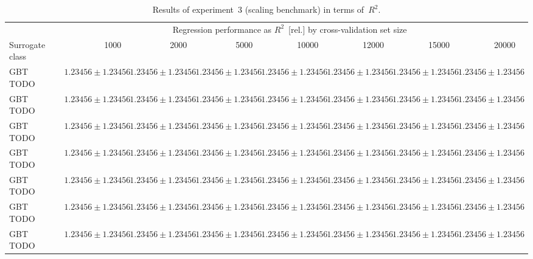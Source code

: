 \begin{table}[h]
	\centering
	{\footnotesize
		\begin{tabular}{lrrrrrrrr}
		\toprule
		{} & \multicolumn{7}{c}{Regression performance as $R^2$~[rel.] by cross-validation set size}\\
		\cmidrule(lr){2-8}
		Surrogate class
						& \num{1000}
						& \num{2000}
						& \num{5000}
						& \num{10000}
						& \num{12000}
						& \num{15000}
						& \num{20000}\\
		\midrule
		GBT TODO
						& $\num{1.23456} \pm \num{1.23456}$
						& $\num{1.23456} \pm \num{1.23456}$
						& $\num{1.23456} \pm \num{1.23456}$
						& $\num{1.23456} \pm \num{1.23456}$
						& $\num{1.23456} \pm \num{1.23456}$
						& $\num{1.23456} \pm \num{1.23456}$
						& $\num{1.23456} \pm \num{1.23456}$
		\\
		GBT TODO
						& $\num{1.23456} \pm \num{1.23456}$
						& $\num{1.23456} \pm \num{1.23456}$
						& $\num{1.23456} \pm \num{1.23456}$
						& $\num{1.23456} \pm \num{1.23456}$
						& $\num{1.23456} \pm \num{1.23456}$
						& $\num{1.23456} \pm \num{1.23456}$
						& $\num{1.23456} \pm \num{1.23456}$
		\\
		GBT TODO
						& $\num{1.23456} \pm \num{1.23456}$
						& $\num{1.23456} \pm \num{1.23456}$
						& $\num{1.23456} \pm \num{1.23456}$
						& $\num{1.23456} \pm \num{1.23456}$
						& $\num{1.23456} \pm \num{1.23456}$
						& $\num{1.23456} \pm \num{1.23456}$
						& $\num{1.23456} \pm \num{1.23456}$
		\\
		GBT TODO
						& $\num{1.23456} \pm \num{1.23456}$
						& $\num{1.23456} \pm \num{1.23456}$
						& $\num{1.23456} \pm \num{1.23456}$
						& $\num{1.23456} \pm \num{1.23456}$
						& $\num{1.23456} \pm \num{1.23456}$
						& $\num{1.23456} \pm \num{1.23456}$
						& $\num{1.23456} \pm \num{1.23456}$
		\\
		GBT TODO
						& $\num{1.23456} \pm \num{1.23456}$
						& $\num{1.23456} \pm \num{1.23456}$
						& $\num{1.23456} \pm \num{1.23456}$
						& $\num{1.23456} \pm \num{1.23456}$
						& $\num{1.23456} \pm \num{1.23456}$
						& $\num{1.23456} \pm \num{1.23456}$
						& $\num{1.23456} \pm \num{1.23456}$
		\\
		GBT TODO
						& $\num{1.23456} \pm \num{1.23456}$
						& $\num{1.23456} \pm \num{1.23456}$
						& $\num{1.23456} \pm \num{1.23456}$
						& $\num{1.23456} \pm \num{1.23456}$
						& $\num{1.23456} \pm \num{1.23456}$
						& $\num{1.23456} \pm \num{1.23456}$
						& $\num{1.23456} \pm \num{1.23456}$
		\\
		GBT TODO
						& $\num{1.23456} \pm \num{1.23456}$
						& $\num{1.23456} \pm \num{1.23456}$
						& $\num{1.23456} \pm \num{1.23456}$
						& $\num{1.23456} \pm \num{1.23456}$
						& $\num{1.23456} \pm \num{1.23456}$
						& $\num{1.23456} \pm \num{1.23456}$
						& $\num{1.23456} \pm \num{1.23456}$
		\\
		\bottomrule
		\end{tabular}
	}
	\caption{Results of experiment~3 (scaling benchmark) in terms of~$R^2$.}
	\label{tbl:exp3-detailed-results-r2}
\end{table}

